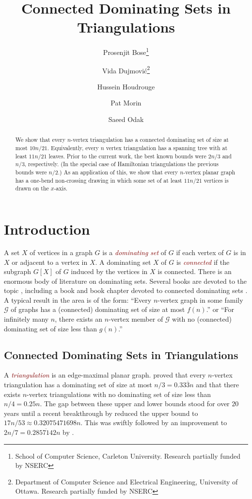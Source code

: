 \documentclass{article}
\title{Connected Dominating Sets in Triangulations}
\author{%
  Prosenjit Bose\thanks{School of Computer Science, Carleton University. Research partially funded by NSERC} \and
  Vida Dujmović\thanks{Department of Computer Science and Electrical Engineering, University of Ottawa. Research partially funded by NSERC}\and
  Hussein Houdrouge\footnotemark[1] \and
  Pat Morin\footnotemark[1] \and
  Saeed Odak\footnotemark[2]}
\date{}
\newcommand{\defin}[1]{\emph{\textcolor{Maroon}{#1}}}
\theoremstyle{definition}
\begin{document}
\maketitle

\begin{abstract}
  We show that every $n$-vertex triangulation has a connected dominating set of size at most $10n/21$.  Equivalently, every $n$ vertex triangulation has a spanning tree with at least $11n/21$ leaves. Prior to the current work, the best known bounds were $2n/3$ and $n/3$, respectively. (In the special case of Hamiltonian triangulations the previous bounds were $n/2$.)  As an application of this, we show that every $n$-vertex planar graph has a one-bend non-crossing drawing in which some set of at least $11n/21$ vertices is drawn on the $x$-axis.
\end{abstract}


\section{Introduction}

A set $X$ of vertices in a graph $G$ is a \defin{dominating set} of $G$ if each vertex of $G$ is in $X$ or adjacent to a vertex in $X$.  A dominating set $X$ of $G$ is \defin{connected} if the subgraph $G[X]$ of $G$ induced by the vertices in $X$ is connected.  There is an enormous body of literature on dominating sets. Several books are devoted to the topic \cite{haynes.hedetniemi.ea:domination,haynes.hedetniemi.ea:topics,du.wan:connected,haynes.hedetniemi.ea:vol2}, including a book and book chapter devoted to connected dominating sets \cite{du.wan:connected,chellali.favaron:connected}.  A typical result in the area is of the form: ``Every $n$-vertex graph in some family $\mathcal{G}$ of graphs has a (connected) dominating set of size at most $f(n)$.'' or ``For infinitely many $n$, there exists an $n$-vertex member of $\mathcal{G}$ with no (connected) dominating set of size less than $g(n)$.''

\subsection{Connected Dominating Sets in Triangulations}

A \defin{triangulation} is an edge-maximal planar graph.  \citet{matheson.tarjan:dominating} proved that every $n$-vertex triangulation has a dominating set of size at most $n/3=0.33\overline{3}n$ and that there exists $n$-vertex triangulations with no dominating set of size less than $n/4=0.25n$. The gap between these upper and lower bounds stood for over $20$ years until a recent breakthrough by \citet{spacapan:domination} reduced the upper bound to $17n/53\approx 0.32075471698n$.  This was swiftly followed by an improvement to $2n/7= 0.2\overline{857142}n$ by \citet{christiansen.rotenberg.ea:triangulations}.
\end{document}
